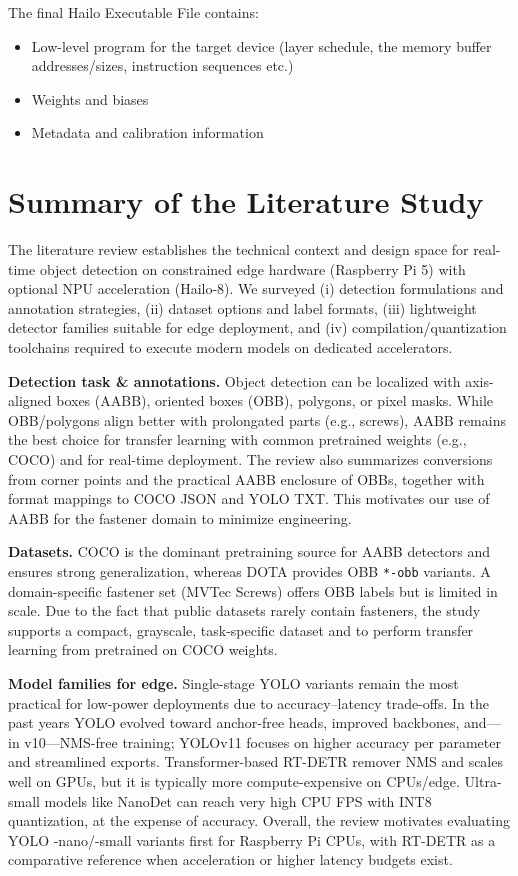 \documentclass[12pt,a4paper]{report}
\begin{document}
    The final Hailo Executable File contains:
    \begin{itemize}
        \item Low-level program for the target device (layer schedule, the memory buffer addresses/sizes,
            instruction sequences etc.)
        \item Weights and biases
        \item Metadata and calibration information
    \end{itemize}


\section{Summary of the Literature Study}
\label{sec:lit-summary}

The literature review establishes the technical context and design space for real-time object detection
on constrained edge hardware (Raspberry Pi 5) with optional NPU acceleration (Hailo-8).
We surveyed (i) detection formulations and annotation strategies, (ii) dataset options and label formats,
(iii) lightweight detector families suitable for edge deployment,
and (iv) compilation/quantization toolchains required to execute modern models on dedicated accelerators.

\textbf{Detection task \& annotations.}
Object detection can be localized with axis-aligned boxes (AABB), oriented boxes (OBB),
polygons, or pixel masks. While OBB/polygons align better with prolongated parts (e.g., screws),
AABB remains the best choice for transfer learning with common pretrained weights (e.g., COCO)
and for real-time deployment. The review also summarizes conversions from corner points
and the practical AABB enclosure of OBBs, together with format mappings to COCO JSON and YOLO TXT.
This motivates our use of AABB for the fastener domain to minimize engineering.

\textbf{Datasets.}
COCO is the dominant pretraining source for AABB detectors and ensures strong generalization,
whereas DOTA provides OBB \texttt{*-obb} variants.
A domain-specific fastener set (MVTec Screws) offers OBB labels but is limited in scale.
Due to the fact that public datasets rarely contain fasteners, the study supports
a compact, grayscale, task-specific dataset and to perform transfer learning from pretrained on COCO weights.

\textbf{Model families for edge.}
Single-stage YOLO variants remain the most practical for low-power deployments
due to accuracy–latency trade-offs. In the past years YOLO evolved toward anchor-free heads,
improved backbones, and—in v10—NMS-free training;
YOLOv11 focuses on higher accuracy per parameter and streamlined exports.
Transformer-based RT-DETR remover NMS and scales well on GPUs,
but it is typically more compute-expensive on CPUs/edge. Ultra-small models like NanoDet can reach
very high CPU FPS with INT8 quantization, at the expense of accuracy. Overall, the review motivates
evaluating YOLO -nano/-small variants first for Raspberry Pi CPUs, with RT-DETR as
a comparative reference when acceleration or higher latency budgets exist.
\end{document}
